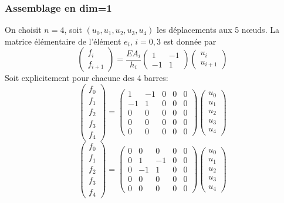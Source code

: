 \documentclass{beamer}
\begin{document}
\begin{frame}
\frametitle{Assemblage en dim=1}
On choisit $n=4$, soit $(u_0,u_1,u_2,u_3,u_4)$ les déplacements aux 5 nœuds. La matrice élémentaire de l'élément $e_i$, $i=0,3$ est donnée
par
\[\left(\begin{array}{r} 
f_{i}\\f_{i+1}
\end{array}\right)=\frac{EA_i}{h_i}\left(\begin{array}{rr} 
1&-1\\-1&1
\end{array}\right) \left(\begin{array}{l} 
u_{i}\\u_{i+1}
\end{array}\right)
\]
Soit explicitement pour chacune des 4 barres:
\[\left(\begin{array}{c} 
f_{0}\\f_{1}\\f_{2}\\f_{3}\\f_{4}
\end{array}\right)=\left(\begin{array}{rrrrr} 
1&-1&0&0&0\\-1&1&0&0&0\\
0&0&0&0&0\\
0&0&0&0&0\\
0&0&0&0&0
\end{array}\right) \left(\begin{array}{l} 
u_{0}\\u_{1}\\u_{2}\\u_{3}\\u_{4}
\end{array}\right)
\]
\[\left(\begin{array}{c} 
f_{0}\\f_{1}\\f_{2}\\f_{3}\\f_{4}
\end{array}\right)=\left(\begin{array}{rrrrr} 
0&0&0&0&0\\
0&1&-1&0&0\\0&-1&1&0&0\\
0&0&0&0&0\\
0&0&0&0&0
\end{array}\right) \left(\begin{array}{l} 
u_{0}\\u_{1}\\u_{2}\\u_{3}\\u_{4}
\end{array}\right)
\]
\end{frame}
\end{document}
